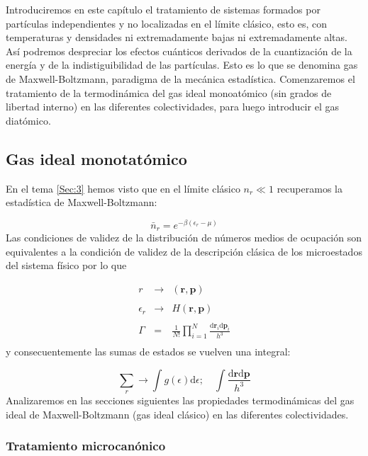 \documentclass[12pt,a4paper]{article}
\numberwithin{equation}{section}
\numberwithin{figure}{section}
\newcommand{\D}{\mathrm{d}}
\newcommand{\pn}{\mathbf{p}}
\newcommand{\rn}{\mathbf{r}}
\theoremstyle{definition}
\begin{document}
Introduciremos en este capítulo el tratamiento de sistemas formados por partículas independientes y no localizadas en el límite clásico, esto es, con temperaturas y densidades ni extremadamente bajas ni extremadamente altas. Así podremos despreciar los efectos cuánticos derivados de la cuantización de la energía y de la indistiguibilidad de las partículas. Esto es lo que se denomina gas de Maxwell-Boltzmann, paradigma de la mecánica estadística. Comenzaremos el tratamiento de la termodinámica del gas ideal monoatómico (sin grados de libertad interno) en las diferentes colectividades, para luego introducir el gas diatómico. 

\subsection{Gas ideal monotatómico}

En el tema \ref{Sec:3} hemos visto que en el límite clásico $n_r \ll 1$ recuperamos la estadística de Maxwell-Boltzmann:

\begin{equation}
\bar{n}_r = e^{-\beta (\epsilon_r - \mu)}
\end{equation} 
Las condiciones de validez de la distribución de números medios de ocupación son equivalentes a la condición de validez de la descripción clásica de los microestados del sistema físico por lo que

\begin{equation}
\begin{array}{lll}
r & \rightarrow  &(\rn,\pn) \\ \\
\epsilon_r & \rightarrow  & H(\rn,\pn) \\  \\
\Gamma &  =  & \frac{1}{N!} \prod_{i=1}^N \frac{\D \rn_i \D \pn_i}{h^3} \\
\end{array}
\end{equation}
y consecuentemente las sumas de estados se vuelven una integral:

\begin{equation}
\sum_r \longrightarrow \int g(\epsilon) \D \epsilon ; \quad \int \frac{\D  \rn \D \pn}{h^3}
\end{equation}
Analizaremos en las secciones siguientes las propiedades termodinámicas del gas ideal de Maxwell-Boltzmann (gas ideal clásico) en las diferentes colectividades. \\

\subsubsection{Tratamiento microcanónico}
\end{document}
